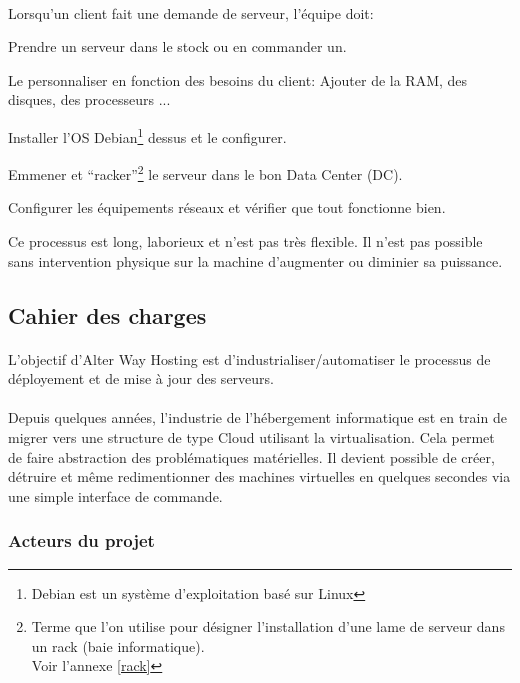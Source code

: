 \paragraph*{}
Lorsqu'un client fait une demande de serveur, l'équipe doit:
\begin{listi}
	\item Prendre un serveur dans le stock ou en commander un.
	\item Le personnaliser en fonction des besoins du client: Ajouter de la RAM, des disques, des processeurs ...
	\item Installer l'OS Debian\footnote{Debian est un système d'exploitation basé sur Linux} dessus et le configurer.
	\item Emmener et ``racker''\footnote{Terme que l'on utilise pour désigner l'installation d'une lame de serveur dans un rack (baie informatique).\\
		Voir l'annexe \ref{rack}} le serveur
	dans le bon Data Center (DC).
	\item Configurer les équipements réseaux et vérifier que tout fonctionne bien.
\end{listi}

Ce processus est long, laborieux et n'est pas très flexible. Il n'est pas possible sans intervention physique sur la machine d'augmenter ou diminier sa puissance.

\subsection{Cahier des charges}
\paragraph*{}
L'objectif d'Alter Way Hosting est d'industrialiser/automatiser le processus de déployement et de mise à jour des serveurs.

\paragraph*{}
Depuis quelques années, l'industrie de l'hébergement informatique est en train de migrer vers une structure de type Cloud utilisant la virtualisation.
Cela permet de faire abstraction des problématiques matérielles. Il devient possible de créer, détruire et même redimentionner des machines virtuelles en
quelques secondes via une simple interface de commande.

\subsubsection{Acteurs du projet}

